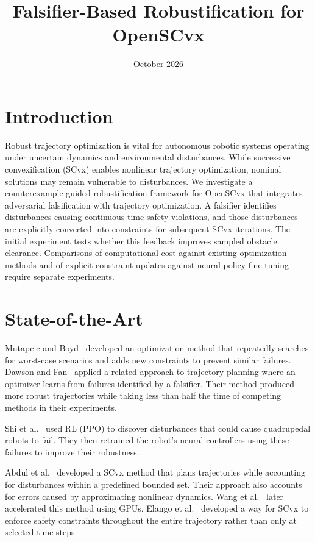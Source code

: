 \documentclass{article}
\title{Falsifier-Based Robustification for OpenSCvx}
\date{October 2026}
\begin{document}
\maketitle

\section{Introduction}
Robust trajectory optimization is vital for autonomous robotic systems operating under uncertain dynamics and environmental disturbances. While successive convexification (SCvx) enables nonlinear trajectory optimization, nominal solutions may remain vulnerable to disturbances. We investigate a counterexample-guided robustification framework for OpenSCvx that integrates adversarial falsification with trajectory optimization. A falsifier identifies disturbances causing continuous-time safety violations, and those disturbances are explicitly converted into constraints for subsequent SCvx iterations. The initial experiment tests whether this feedback improves sampled obstacle clearance. Comparisons of computational cost against existing optimization methods and of explicit constraint updates against neural policy fine-tuning require separate experiments.
\section{State-of-the-Art}
\begingroup
\setlength{\parskip}{0.8em}
\setlength{\parindent}{0pt}

Mutapcic and Boyd~\cite{mutapcic2009} developed an optimization method that repeatedly searches for worst-case scenarios and adds new constraints to prevent similar failures. Dawson and Fan~\cite{dawson2022} applied a related approach to trajectory planning where an optimizer learns from failures identified by a falsifier. Their method produced more robust trajectories while taking less than half the time of competing methods in their experiments.

Shi et al.~\cite{shi2024} used RL (PPO) to discover disturbances that could cause quadrupedal robots to fail. They then retrained the robot's neural controllers using these failures to improve their robustness.

Abdul et al.~\cite{abdul2025} developed a SCvx method that plans trajectories while accounting for disturbances within a predefined bounded set. Their approach also accounts for errors caused by approximating nonlinear dynamics. Wang et al.~\cite{wang2026} later accelerated this method using GPUs. Elango et al.~\cite{elango2025} developed a way for SCvx to enforce safety constraints throughout the entire trajectory rather than only at selected time steps.
\end{document}
